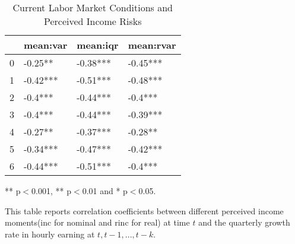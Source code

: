 
\begin{table}[ht]
\centering
\begin{adjustbox}{width={\textwidth}}
\begin{threeparttable}
\caption{Current Labor Market Conditions and Perceived Income Risks}
\label{macro_corr_he}
\begin{tabular}{llll}
\toprule
{} &  mean:var &  mean:iqr & mean:rvar \\
\midrule
0 &   -0.25** &  -0.38*** &  -0.45*** \\
1 &  -0.42*** &  -0.51*** &  -0.48*** \\
2 &   -0.4*** &  -0.44*** &   -0.4*** \\
3 &   -0.4*** &  -0.44*** &  -0.39*** \\
4 &   -0.27** &  -0.37*** &   -0.28** \\
5 &  -0.34*** &  -0.47*** &  -0.42*** \\
6 &  -0.44*** &  -0.51*** &   -0.4*** \\
\bottomrule
\end{tabular}
\begin{tablenotes}
\item *** p$<$0.001, ** p$<$0.01 and * p$<$0.05.
\item This table reports correlation coefficients between different perceived income moments(inc for nominal
and rinc for real) at time
$t$ and the quarterly growth rate in hourly earning at $t,t-1,...,t-k$.
\end{tablenotes}
\end{threeparttable}
\end{adjustbox}
\end{table}